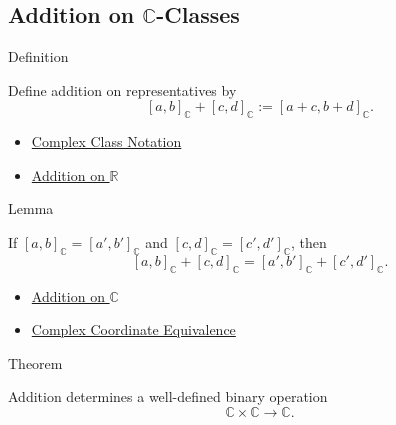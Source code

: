 \subsection*{\texorpdfstring{Addition on $\mathbb{C}$-Classes}{Addition on C-Classes}}

\begin{definitionbox}{Definition}
\begin{definition}
\label{def:addition-on-c-classes}
Define addition on representatives by
\[
[a,b]_{\mathbb{C}}+[c,d]_{\mathbb{C}}
:=[a+c,b+d]_{\mathbb{C}}.
\]
\end{definition}
\end{definitionbox}

\begin{dependencies}
\begin{itemize}
  \item \hyperref[def:complex-class-notation]{Complex Class Notation}
  \item \hyperref[def:addition-on-r]{Addition on $\mathbb{R}$}
\end{itemize}
\end{dependencies}

\begin{lemmabox}{Lemma}
\begin{lemma}
\label{lem:addition-on-c-respects-equivalence}
If $[a,b]_{\mathbb{C}}=[a',b']_{\mathbb{C}}$ and
$[c,d]_{\mathbb{C}}=[c',d']_{\mathbb{C}}$, then
\[
[a,b]_{\mathbb{C}}+[c,d]_{\mathbb{C}}
=
[a',b']_{\mathbb{C}}+[c',d']_{\mathbb{C}}.
\]
\end{lemma}
\end{lemmabox}

\begin{dependencies}
\begin{itemize}
  \item \hyperref[def:addition-on-c-classes]{Addition on $\mathbb{C}$}
  \item \hyperref[def:complex-coordinate-equivalence]{Complex Coordinate Equivalence}
\end{itemize}
\end{dependencies}

\begin{theorembox}{Theorem}
\begin{theorem}
\label{thm:addition-on-c-well-defined}
Addition determines a well-defined binary operation
\[
\mathbb{C}\times\mathbb{C}\to\mathbb{C}.
\]
\end{theorem}
\end{theorembox}


